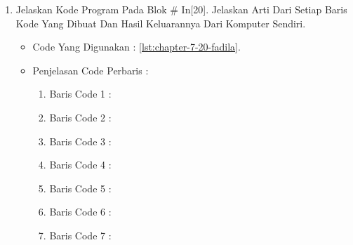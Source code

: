 \begin{enumerate}
\par
\par
\par
\item Jelaskan Kode Program Pada Blok \# In[20]. Jelaskan Arti Dari Setiap Baris Kode Yang Dibuat Dan Hasil Keluarannya Dari Komputer Sendiri.
\begin{itemize}
\item Code Yang Digunakan : \ref{lst:chapter-7-20-fadila}.

\par
\par
\item Penjelasan Code Perbaris	: 
\begin{enumerate}
\item Baris Code 1	:
\item Baris Code 2	:
\item Baris Code 3	:
\item Baris Code 4	:
\item Baris Code 5	:
\item Baris Code 6	:
\item Baris Code 7	:
\end{enumerate}
\par
\end{itemize}
\par
\par
\par
\end{enumerate}


